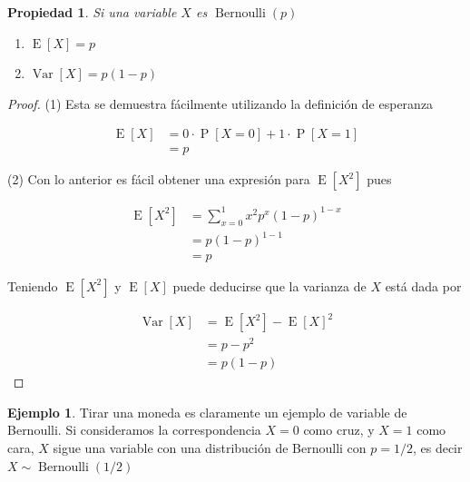 \documentclass[]{book}
\theoremstyle{plain}
\newtheorem{property}[theorem]{Propiedad}
\theoremstyle{definition}
\newtheorem{example}[theorem]{Ejemplo}
\theoremstyle{definition} %
\begin{document}
\begin{property} Si una variable $X$ es  $\operatorname {Bernoulli} (p)$
 \begin{enumerate} [(1)]
   \item $\operatorname {E} \left[X\right]=p$
   \item  $\operatorname {Var} \left[X\right]=p(1-p)$
 \end{enumerate}
  
\end{property}

\begin{proof}
(1) Esta se demuestra fácilmente utilizando la definición de esperanza

\[\displaystyle {\begin{aligned}\operatorname {E} [X]&=0\cdot \operatorname {P} [X=0]+1\cdot \operatorname {P} [X=1]\\&=p\end{aligned}}\]

(2) Con lo anterior es fácil obtener una expresión para
\(\displaystyle \operatorname {E} [X^{2}]\) pues

\[\displaystyle {\begin{aligned}\operatorname {E} [X^{2}]&=\sum _{x=0}^{1}x^{2}p^{x}(1-p)^{1-x}\\&=p(1-p)^{1-1}\\&=p\end{aligned}}\]
 
Teniendo \(\displaystyle \operatorname {E} [X^{2}]\) y
\(\displaystyle \operatorname {E} [X]\) puede deducirse que la varianza
de \(X\) está dada por

\[\displaystyle {\begin{aligned}\operatorname {Var} \left[X\right]&=\operatorname {E} [X^{2}]-\operatorname {E} [X]^{2}\\&=p-p^{2}\\&=p\left(1-p\right)\end{aligned}}\]

\end{proof}

\begin{example}

Tirar una moneda es claramente un ejemplo de variable de Bernoulli. Si
consideramos la correspondencia \(X=0\) como cruz, y \(X=1\) como cara,
\(X\) sigue una variable con una distribución de Bernoulli con
\(p=1/2\), es decir
\(\displaystyle X\sim \operatorname {Bernoulli} (1/2)\)
\end{example}
\end{document}
